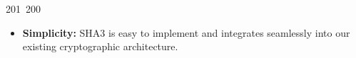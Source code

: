 201~200~\documentclass{article}
\begin{document}
\begin{itemize}
	                                                                                                                                                                                                                                                                                                	                                                                                                                                        	    	                                                                                                	                                                                                                                                                                                                                                                                                                                                	                                                                        	                                                                        	                                                                                                                                        	                                                                                        \item \textbf{Simplicity:} SHA3 is easy to implement and integrates seamlessly into our existing cryptographic architecture.
	                                                                                                                                                                                                                                                                                                	                                                                                                                                        	    	                                                                                                	                                                                                                                                                                                                                                                                                                                                	                                                                        	                                                                        	                                                                                                                                        	                                                                                        \end{itemize}
\end{document}
